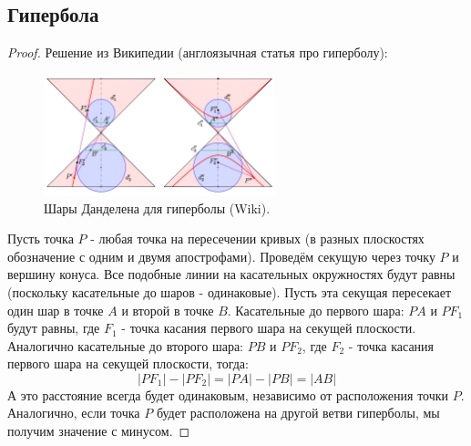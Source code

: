 \documentclass[12pt]{article}
\theoremstyle{definition}
\begin{document}
\subsection*{Гипербола}
\begin{proof}
	Решение из Википедии (англоязычная статья про гиперболу):
	\begin{figure}[H]
		\centering
		\includegraphics[width=0.6\textwidth]{ANGL1_13.png}
		\caption{Шары Данделена для гиперболы (Wiki).}
		\label{1_13}
	\end{figure}
	Пусть точка $P$ - любая точка на пересечении кривых (в разных плоскостях обозначение с одним и двумя апострофами). Проведём секущую через точку $P$ и вершину конуса. Все подобные линии на касательных окружностях будут равны (поскольку касательные до шаров - одинаковые). Пусть эта секущая пересекает один шар в точке $A$ и второй в точке $B$. Касательные до первого шара: $PA$ и $PF_1$ будут равны, где $F_1$ - точка касания первого шара на секущей плоскости. Аналогично касательные до второго шара: $PB$ и $PF_2$, где $F_2$ - точка касания первого шара на секущей плоскости, тогда:
	$$
		|PF_1| - |PF_2| = |PA| - |PB| = |AB|
	$$
	А это расстояние всегда будет одинаковым, независимо от расположения точки $P$. Аналогично, если точка $P$ будет расположена на другой ветви гиперболы, мы получим значение с минусом.
\end{proof}
\end{document}
